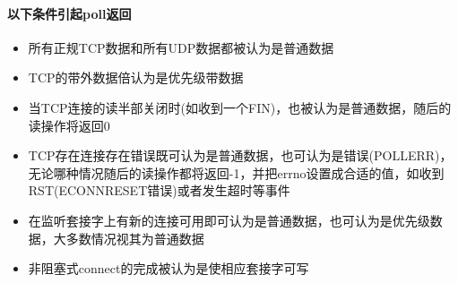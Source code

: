 \begin{spacing}{2.0}
\paragraph{以下条件引起poll返回}
\begin{itemize}
	\item 所有正规TCP数据和所有UDP数据都被认为是普通数据
	\item TCP的带外数据倍认为是优先级带数据
	\item 当TCP连接的读半部关闭时(如收到一个FIN)，也被认为是普通数据，随后的读操作将返回0
	\item TCP存在连接存在错误既可认为是普通数据，也可认为是错误(POLLERR)，无论哪种情况随后的读操作都将返回-1，并把errno设置成合适的值，如收到RST(ECONNRESET错误)或者发生超时等事件
	\item 在监听套接字上有新的连接可用即可认为是普通数据，也可认为是优先级数据，大多数情况视其为普通数据
	\item 非阻塞式connect的完成被认为是使相应套接字可写
\end{itemize}
\end{spacing}
\newpage

